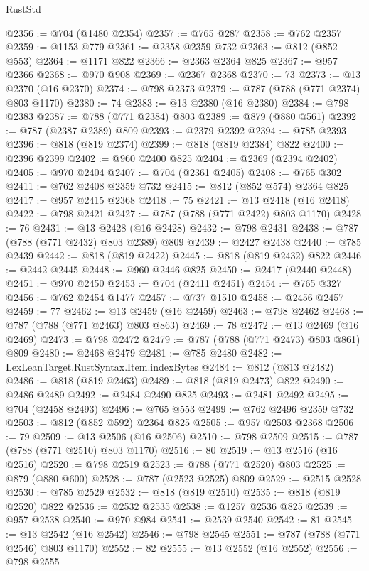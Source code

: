 \begin{lexlean}{RustStd}
\begin{coremodule}
@2356 := @704 (@1480 @2354)
@2357 := @765 @287
@2358 := @762 @2357
@2359 := @1153 @779
@2361 := @2358 @2359 @732
@2363 := @812 (@852 @553)
@2364 := @1171 @822
@2366 := @2363 @2364 @825
@2367 := @957 @2366
@2368 := @970 @908
@2369 := @2367 @2368
@2370 := 73
@2373 := @13 @2370 (@16 @2370)
@2374 := @798 @2373
@2379 := @787 (@788 (@771 @2374) @803 @1170)
@2380 := 74
@2383 := @13 @2380 (@16 @2380)
@2384 := @798 @2383
@2387 := @788 (@771 @2384) @803
@2389 := @879 (@880 @561)
@2392 := @787 (@2387 @2389) @809
@2393 := @2379 @2392
@2394 := @785 @2393
@2396 := @818 (@819 @2374)
@2399 := @818 (@819 @2384) @822
@2400 := @2396 @2399
@2402 := @960 @2400 @825
@2404 := @2369 (@2394 @2402)
@2405 := @970 @2404
@2407 := @704 (@2361 @2405)
@2408 := @765 @302
@2411 := @762 @2408 @2359 @732
@2415 := @812 (@852 @574) @2364 @825
@2417 := @957 @2415 @2368
@2418 := 75
@2421 := @13 @2418 (@16 @2418)
@2422 := @798 @2421
@2427 := @787 (@788 (@771 @2422) @803 @1170)
@2428 := 76
@2431 := @13 @2428 (@16 @2428)
@2432 := @798 @2431
@2438 := @787 (@788 (@771 @2432) @803 @2389) @809
@2439 := @2427 @2438
@2440 := @785 @2439
@2442 := @818 (@819 @2422)
@2445 := @818 (@819 @2432) @822
@2446 := @2442 @2445
@2448 := @960 @2446 @825
@2450 := @2417 (@2440 @2448)
@2451 := @970 @2450
@2453 := @704 (@2411 @2451)
@2454 := @765 @327
@2456 := @762 @2454 @1477
@2457 := @737 @1510
@2458 := @2456 @2457
@2459 := 77
@2462 := @13 @2459 (@16 @2459)
@2463 := @798 @2462
@2468 := @787 (@788 (@771 @2463) @803 @863)
@2469 := 78
@2472 := @13 @2469 (@16 @2469)
@2473 := @798 @2472
@2479 := @787 (@788 (@771 @2473) @803 @861) @809
@2480 := @2468 @2479
@2481 := @785 @2480
@2482 := LexLeanTarget.RustSyntax.Item.indexBytes
@2484 := @812 (@813 @2482)
@2486 := @818 (@819 @2463)
@2489 := @818 (@819 @2473) @822
@2490 := @2486 @2489
@2492 := @2484 @2490 @825
@2493 := @2481 @2492
@2495 := @704 (@2458 @2493)
@2496 := @765 @553
@2499 := @762 @2496 @2359 @732
@2503 := @812 (@852 @592) @2364 @825
@2505 := @957 @2503 @2368
@2506 := 79
@2509 := @13 @2506 (@16 @2506)
@2510 := @798 @2509
@2515 := @787 (@788 (@771 @2510) @803 @1170)
@2516 := 80
@2519 := @13 @2516 (@16 @2516)
@2520 := @798 @2519
@2523 := @788 (@771 @2520) @803
@2525 := @879 (@880 @600)
@2528 := @787 (@2523 @2525) @809
@2529 := @2515 @2528
@2530 := @785 @2529
@2532 := @818 (@819 @2510)
@2535 := @818 (@819 @2520) @822
@2536 := @2532 @2535
@2538 := @1257 @2536 @825
@2539 := @957 @2538
@2540 := @970 @984
@2541 := @2539 @2540
@2542 := 81
@2545 := @13 @2542 (@16 @2542)
@2546 := @798 @2545
@2551 := @787 (@788 (@771 @2546) @803 @1170)
@2552 := 82
@2555 := @13 @2552 (@16 @2552)
@2556 := @798 @2555

\end{coremodule}
\end{lexlean}
